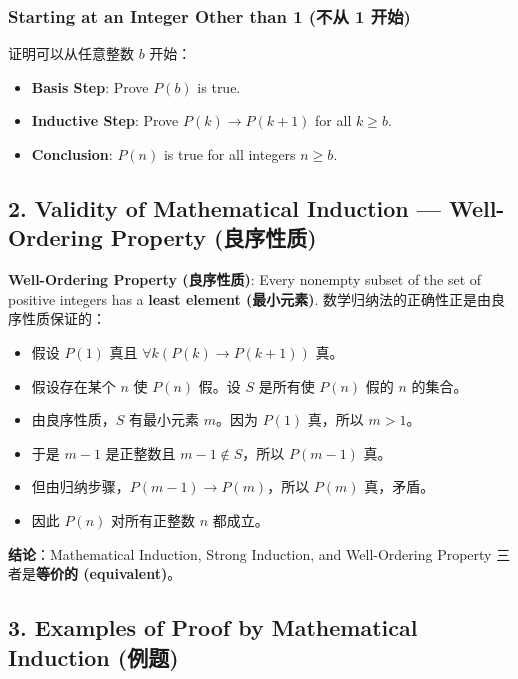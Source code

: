 \documentclass[10pt,a4paper,openany]{ctexbook}
\theoremstyle{definition}
\theoremstyle{remark}
\renewenvironment{quote}
  {\list{}{\leftmargin=1em\rightmargin=0pt\topsep=0.5pt\partopsep=0pt}\item[]}
  {\endlist}
\begin{document}
\subsubsection{Starting at an Integer Other than 1 (不从 1 开始)}

证明可以从任意整数 $b$ 开始：
\begin{itemize}
\item \textbf{Basis Step}: Prove $P(b)$ is true.
\item \textbf{Inductive Step}: Prove $P(k) \to P(k+1)$ for all $k \ge b$.
\item \textbf{Conclusion}: $P(n)$ is true for all integers $n \ge b$.

\end{itemize}

\vspace{-2pt}

\subsection{2. Validity of Mathematical Induction — Well-Ordering Property (良序性质)}

\textbf{Well-Ordering Property (良序性质)}: Every nonempty subset of the set of positive integers has a \textbf{least element (最小元素)}.
数学归纳法的正确性正是由良序性质保证的：
\begin{itemize}
\item 假设 $P(1)$ 真且 $\forall k (P(k) \to P(k+1))$ 真。
\item 假设存在某个 $n$ 使 $P(n)$ 假。设 $S$ 是所有使 $P(n)$ 假的 $n$ 的集合。
\item 由良序性质，$S$ 有最小元素 $m$。因为 $P(1)$ 真，所以 $m > 1$。
\item 于是 $m-1$ 是正整数且 $m-1 \notin S$，所以 $P(m-1)$ 真。
\item 但由归纳步骤，$P(m-1) \to P(m)$，所以 $P(m)$ 真，矛盾。
\item 因此 $P(n)$ 对所有正整数 $n$ 都成立。

\end{itemize}

\begin{quote}
\textbf{结论}：Mathematical Induction, Strong Induction, and Well-Ordering Property 三者是\textbf{等价的 (equivalent)}。

\end{quote}
\vspace{-2pt}

\subsection{3. Examples of Proof by Mathematical Induction (例题)}
\end{document}
